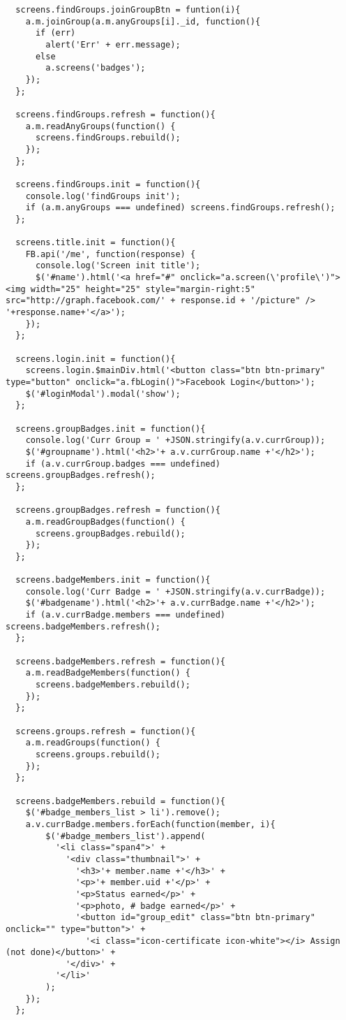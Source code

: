 \begin{lstlisting}
  screens.findGroups.joinGroupBtn = funtion(i){
    a.m.joinGroup(a.m.anyGroups[i]._id, function(){
      if (err) 
        alert('Err' + err.message);
      else
        a.screens('badges');
    });
  };
  
  screens.findGroups.refresh = function(){   
    a.m.readAnyGroups(function() {
      screens.findGroups.rebuild();
    });
  };
  
  screens.findGroups.init = function(){
    console.log('findGroups init');
    if (a.m.anyGroups === undefined) screens.findGroups.refresh();
  };
  
  screens.title.init = function(){
    FB.api('/me', function(response) {
      console.log('Screen init title');
      $('#name').html('<a href="#" onclick="a.screen(\'profile\')"><img width="25" height="25" style="margin-right:5" src="http://graph.facebook.com/' + response.id + '/picture" />  '+response.name+'</a>');
    });
  };
  
  screens.login.init = function(){
    screens.login.$mainDiv.html('<button class="btn btn-primary" type="button" onclick="a.fbLogin()">Facebook Login</button>');
    $('#loginModal').modal('show');
  };
  
  screens.groupBadges.init = function(){
    console.log('Curr Group = ' +JSON.stringify(a.v.currGroup));
    $('#groupname').html('<h2>'+ a.v.currGroup.name +'</h2>');
    if (a.v.currGroup.badges === undefined) screens.groupBadges.refresh();
  };
  
  screens.groupBadges.refresh = function(){   
    a.m.readGroupBadges(function() {
      screens.groupBadges.rebuild();
    });
  };
  
  screens.badgeMembers.init = function(){
    console.log('Curr Badge = ' +JSON.stringify(a.v.currBadge));
    $('#badgename').html('<h2>'+ a.v.currBadge.name +'</h2>');
    if (a.v.currBadge.members === undefined) screens.badgeMembers.refresh();
  };
  
  screens.badgeMembers.refresh = function(){   
    a.m.readBadgeMembers(function() {
      screens.badgeMembers.rebuild();
    });
  };
  
  screens.groups.refresh = function(){   
    a.m.readGroups(function() {
      screens.groups.rebuild();
    });
  };
  
  screens.badgeMembers.rebuild = function(){
    $('#badge_members_list > li').remove();
    a.v.currBadge.members.forEach(function(member, i){
        $('#badge_members_list').append(
          '<li class="span4">' +
            '<div class="thumbnail">' +
              '<h3>'+ member.name +'</h3>' +
              '<p>'+ member.uid +'</p>' +
              '<p>Status earned</p>' +
              '<p>photo, # badge earned</p>' +
              '<button id="group_edit" class="btn btn-primary" onclick="" type="button">' +
                '<i class="icon-certificate icon-white"></i> Assign (not done)</button>' +
            '</div>' +
          '</li>'
        );  
    });
  };
  

\end{lstlisting}
